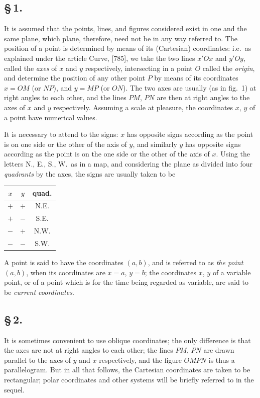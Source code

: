 \documentclass[11pt,a4paper]{article}
\begin{document}
\subsection*{\S\,1.}

It is assumed that the points, lines, and figures considered exist in one and the same plane, which plane, therefore, need not be in any way referred to. The position of a point is determined by means of its (Cartesian) coordinates: i.e.\ as explained under the article Curve, [785], we take the two lines $x'Ox$ and $y'Oy$, called the \textit{axes} of $x$ and $y$ respectively, intersecting in a point $O$ called the \textit{origin}, and determine the position of any other point $P$ by means of its coordinates $x = OM$ (or $NP$), and $y = MP$ (or $ON$). The two axes are usually (as in fig.~1) at right angles to each other, and the lines $PM$, $PN$ are then at right angles to the axes of $x$ and $y$ respectively. Assuming a scale at pleasure, the coordinates $x$, $y$ of a point have numerical values.

It is necessary to attend to the signs: $x$ has opposite signs according as the point is on one side or the other of the axis of $y$, and similarly $y$ has opposite signs according as the point is on the one side or the other of the axis of $x$. Using the letters N., E., S., W.\ as in a map, and considering the plane as divided into four \textit{quadrants} by the axes, the signs are usually taken to be
\begin{center}
\begin{tabular}{c|c|c}
$x$ & $y$ & quad. \\ \hline
$+$ & $+$ & N.E. \\
$+$ & $-$ & S.E. \\
$-$ & $+$ & N.W. \\
$-$ & $-$ & S.W.
\end{tabular}
\end{center}
A point is said to have the coordinates $(a, b)$, and is referred to as \textit{the point $(a, b)$}, when its coordinates are $x = a$, $y = b$; the coordinates $x$, $y$ of a variable point, or of a point which is for the time being regarded as variable, are said to be \textit{current coordinates}.

\subsection*{\S\,2.}

It is sometimes convenient to use oblique coordinates; the only difference is that the axes are not at right angles to each other; the lines $PM$, $PN$ are drawn parallel to the axes of $y$ and $x$ respectively, and the figure $OMPN$ is thus a parallelogram. But in all that follows, the Cartesian coordinates are taken to be rectangular; polar coordinates and other systems will be briefly referred to in the sequel.
\end{document}
